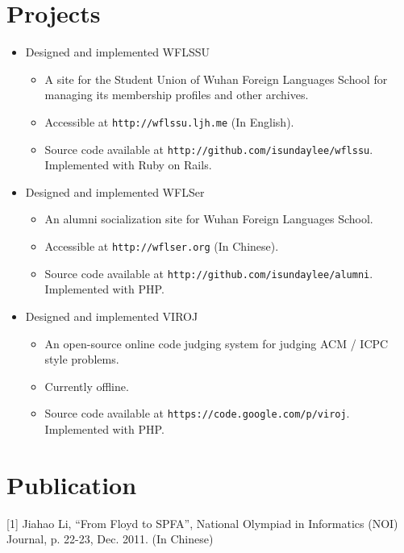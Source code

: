 \documentclass[margin]{res}
\begin{document}
\begin{resume}
\section{Projects}

\begin{itemize}
    \item{
        Designed and implemented WFLSSU
        \begin{itemize}
            \item{A site for the Student Union of Wuhan Foreign Languages School for managing its membership profiles and other archives. }
            \item{Accessible at {\tt http://wflssu.ljh.me} (In English). }
            \item{Source code available at {\tt http://github.com/isundaylee/wflssu}. Implemented with Ruby on Rails. }
        \end{itemize}
    }
    \item{
        Designed and implemented WFLSer
        \begin{itemize}
            \item{An alumni socialization site for Wuhan Foreign Languages School. }
            \item{Accessible at {\tt http://wflser.org} (In Chinese). }
            \item{Source code available at {\tt http://github.com/isundaylee/alumni}. Implemented with PHP. }
        \end{itemize}
        }
    \item{
        Designed and implemented VIROJ
        \begin{itemize}
            \item{An open-source online code judging system for judging ACM / ICPC style problems. }
            \item{Currently offline. }
            \item{Source code available at {\tt https://code.google.com/p/viroj}. Implemented with PHP. }
        \end{itemize}
    }
\end{itemize}

\section{Publication}

[1] Jiahao Li, ``From Floyd to SPFA'', National Olympiad in Informatics (NOI) Journal, p. 22-23, Dec. 2011. (In Chinese)


\end{resume}
\end{document}
